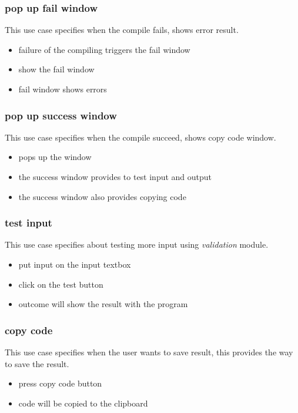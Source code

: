 \documentclass[conference]{IEEEtran}
\begin{document}
\subsubsection{pop up fail window}
This use case specifies when the compile fails, shows error result.
\begin{itemize}
  \item failure of the compiling triggers the fail window
  \item show the fail window
  \item fail window shows errors
\end{itemize}
\textit{}



\subsubsection{pop up success window}
This use case specifies when the compile succeed, shows copy code window.
\begin{itemize}
  \item pops up the window
  \item the success window provides to test input and output
  \item the success window also provides copying code
\end{itemize}
\textit{}



\subsubsection{test input}
This use case specifies about testing more input using \textit{validation} module.
\begin{itemize}
  \item put input on the input textbox
  \item click on the test button
  \item outcome will show the result with the program
\end{itemize}
\textit{}



\subsubsection{copy code}
This use case specifies when the user wants to save result, this provides the way to save the result.
\begin{itemize}
  \item press copy code button
  \item code will be copied to the clipboard
\end{itemize}
\textit{}
\end{document}
